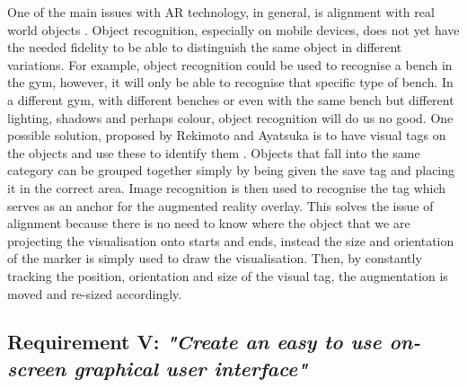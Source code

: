 \documentclass{l4proj}
\begin{document}
One of the main issues with AR technology, in general, is alignment with real world objects \cite{sood_pro_2012}. Object recognition, especially on mobile devices, does not yet have the needed fidelity to be able to distinguish the same object in different variations. For example, object recognition could be used to recognise a bench in the gym, however, it will only be able to recognise that specific type of bench. In a different gym, with different benches or even with the same bench but different lighting, shadows and perhaps colour, object recognition will do us no good. One possible solution, proposed by Rekimoto and Ayatsuka is to have visual tags on the objects and use these to identify them \cite{rekimoto_cybercode:_2000}. Objects that fall into the same category can be grouped together simply by being given the save tag and placing it in the correct area. Image recognition is then used to recognise the tag which serves as an anchor for the augmented reality overlay. This solves the issue of alignment because there is no need to know where the object that we are projecting the visualisation onto starts and ends, instead the size and orientation of the marker is simply used to draw the visualisation. Then, by constantly tracking the position, orientation and size of the visual tag, the augmentation is moved and re-sized accordingly.

\subsection{\textbf{Requirement V:} \textit{"Create an easy to use on-screen graphical user interface"}}   
\label{requirement_V}
\end{document}
